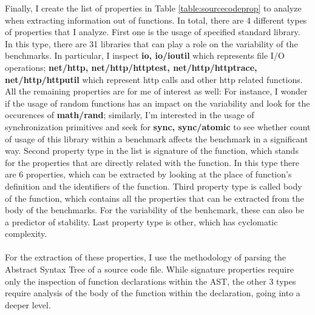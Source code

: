 \documentclass{seal_thesis}
\begin{document}
Finally, I create the list of properties in Table \ref{table:sourcecodeprop} to analyze when extracting information out of functions. In total, there are 4 different types of properties that I analyze. First one is the usage of specified standard library. In this type, there are 31 libraries that can play a role on the variability of the benchmarks. In particular, I inspect \textbf{io, io/ioutil} which represents file I/O operations; \textbf{net/http, net/http/httptest, net/http/httptrace, net/http/httputil} which represent http calls and other http related functions. All the remaining properties are for me of interest as well: For instance, I wonder if the usage of random functions has an impact on the variability and look for the occurences of \textbf{math/rand}; similarly, I'm interested in the usage of synchronization primitives and seek for \textbf{sync, sync/atomic} to see whether count of usage of this library within a benchmark affects the benchmark in a significant way. Second property type in the list is signature of the function, which stands for the properties that are directly related with the function. In this type there are 6 properties, which can be extracted by looking at the place of function's definition and the identifiers of the function. Third property type is called body of the function, which contains all the properties that can be extracted from the body of the benchmarks. For the variability of the benhcmark, these can also be a predictor of stability. Last property type is other, which has cyclomatic complexity.\\
\\
For the extraction of these properties, I use the methodology of parsing the Abstract Syntax Tree of a source code file. While signature properties require only the inspection of function declarations within the AST, the other 3 types require analysis of the body of the function within the declaration, going into a deeper level.
\end{document}
